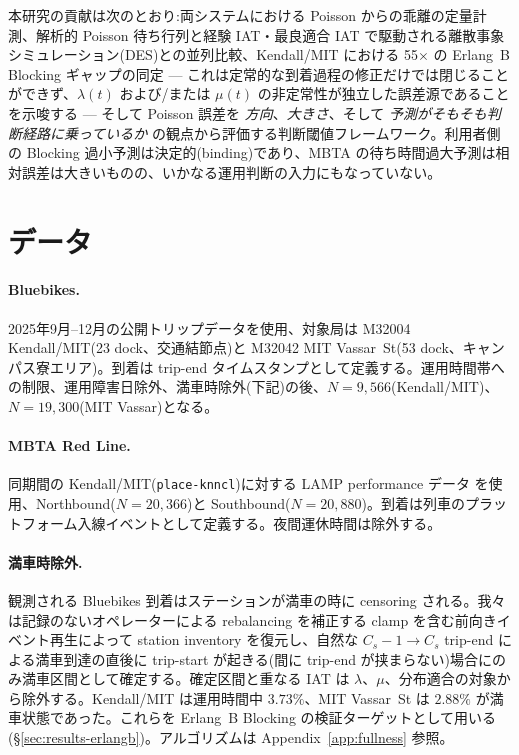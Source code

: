 本研究の貢献は次のとおり:両システムにおける Poisson からの乖離の定量計測、解析的 Poisson 待ち行列と経験 IAT・最良適合 IAT で駆動される離散事象シミュレーション(DES)との並列比較、Kendall/MIT における 55$\times$ の Erlang~B Blocking ギャップの同定 — これは定常的な到着過程の修正だけでは閉じることができず、$\lambda(t)$ および/または $\mu(t)$ の非定常性が独立した誤差源であることを示唆する — そして Poisson 誤差を \emph{方向}、\emph{大きさ}、そして \emph{予測がそもそも判断経路に乗っているか} の観点から評価する判断閾値フレームワーク。利用者側の Blocking 過小予測は決定的(binding)であり、MBTA の待ち時間過大予測は相対誤差は大きいものの、いかなる運用判断の入力にもなっていない。

\section{データ}\label{sec:data}

\paragraph{Bluebikes.} 2025年9月--12月の公開トリップデータを使用、対象局は M32004 Kendall/MIT(23 dock、交通結節点)と M32042 MIT Vassar~St(53 dock、キャンパス寮エリア)。到着は trip-end タイムスタンプとして定義する。運用時間帯への制限、運用障害日除外、満車時除外(下記)の後、$N = 9{,}566$(Kendall/MIT)、$N = 19{,}300$(MIT Vassar)となる。

\paragraph{MBTA Red Line.} 同期間の Kendall/MIT(\texttt{place-knncl})に対する LAMP performance データ \cite{mbta_lamp} を使用、Northbound($N = 20{,}366$)と Southbound($N = 20{,}880$)。到着は列車のプラットフォーム入線イベントとして定義する。夜間運休時間は除外する。

\paragraph{満車時除外.} 観測される Bluebikes 到着はステーションが満車の時に censoring される。我々は記録のないオペレーターによる rebalancing を補正する clamp を含む前向きイベント再生によって station inventory を復元し、自然な $C_s-1 \to C_s$ trip-end による満車到達の直後に trip-start が起きる(間に trip-end が挟まらない)場合にのみ満車区間として確定する。確定区間と重なる IAT は $\lambda$、$\mu$、分布適合の対象から除外する。Kendall/MIT は運用時間中 $3.73\%$、MIT Vassar~St は $2.88\%$ が満車状態であった。これらを Erlang~B Blocking の検証ターゲットとして用いる(\S\ref{sec:results-erlangb})。アルゴリズムは Appendix~\ref{app:fullness} 参照。

